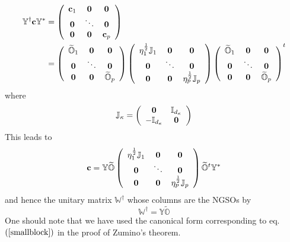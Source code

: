 \documentclass[aps,preprint]{revtex4}%
\begin{document}
\begin{align}
\mathbb{Y}^{\dagger}\mathbf{c}\mathbb{Y}^{\ast}  &  =\left(
\begin{array}
[c]{ccc}%
\mathbf{c}_{1} & \mathbf{0} & \mathbf{0}\\
\mathbf{0} & \ddots & \mathbf{0}\\
\mathbf{0} & \mathbf{0} & \mathbf{c}_{p}%
\end{array}
\right) \nonumber\\
&  =\left(
\begin{array}
[c]{ccc}%
\widetilde{\mathbb{O}}_{1} & \mathbf{0} & \mathbf{0}\\
\mathbf{0} & \ddots & \mathbf{0}\\
\mathbf{0} & \mathbf{0} & \widetilde{\mathbb{O}}_{p}%
\end{array}
\right)  \left(
\begin{array}
[c]{ccc}%
\eta_{1}^{\frac{1}{2}}\mathbb{J}_{1} & \mathbf{0} & \mathbf{0}\\
\mathbf{0} & \ddots & \mathbf{0}\\
\mathbf{0} & \mathbf{0} & \eta_{p}^{\frac{1}{2}}\mathbb{J}_{p}%
\end{array}
\right)  \left(
\begin{array}
[c]{ccc}%
\widetilde{\mathbb{O}}_{1} & \mathbf{0} & \mathbf{0}\\
\mathbf{0} & \ddots & \mathbf{0}\\
\mathbf{0} & \mathbf{0} & \widetilde{\mathbb{O}}_{p}%
\end{array}
\right)  ^{t}%
\end{align}
where
\begin{equation}
\mathbb{J}_{\kappa}=\left(
\begin{array}
[c]{cc}%
\mathbf{0} & \mathbb{I}_{d_{\kappa}}\\
-\mathbb{I}_{d_{\kappa}} & \mathbf{0}%
\end{array}
\right)
\end{equation}
This leads to
\begin{equation}
\mathbf{c}=\mathbb{Y}\widetilde{\mathbb{O}}\left(
\begin{array}
[c]{ccc}%
\eta_{1}^{\frac{1}{2}}\mathbb{J}_{1} & \mathbf{0} & \mathbf{0}\\
\mathbf{0} & \ddots & \mathbf{0}\\
\mathbf{0} & \mathbf{0} & \eta_{p}^{\frac{1}{2}}\mathbb{J}_{p}%
\end{array}
\right)  \widetilde{\mathbb{O}}^{t}\mathbb{Y}^{\ast}%
\end{equation}
and hence the unitary matrix $\mathbb{W}^{\dagger}$ whose columns are the
NGSOs by
\begin{equation}
\mathbb{W}^{\dagger}=\mathbb{Y}\widetilde{\mathbb{O}}%
\end{equation}
One should note that we have used the canonical form corresponding to eq.
$\left(  \ref{smallblock}\right)  $ in the proof of Zumino's theorem.
\end{document}
